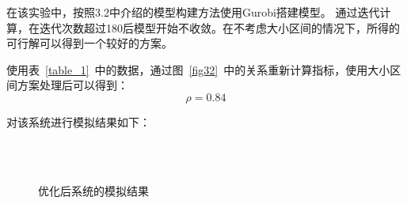 在该实验中，按照3.2中介绍的模型构建方法使用Gurobi搭建模型。
通过迭代计算，在迭代次数超过180后模型开始不收敛。在不考虑大小区间的情况下，所得的可行解可以得到一个较好的方案。

使用表~\ref{table_1}~中的数据，通过图~\ref{fig32}~中的关系重新计算指标，使用大小区间方案处理后可以得到：
$$
\rho = 0.84
$$

对该系统进行模拟结果如下：
\begin{figure}[htbp!]
    \center
    \\
    \\
    \caption{优化后系统的模拟结果}\label{fig47}
\end{figure}
